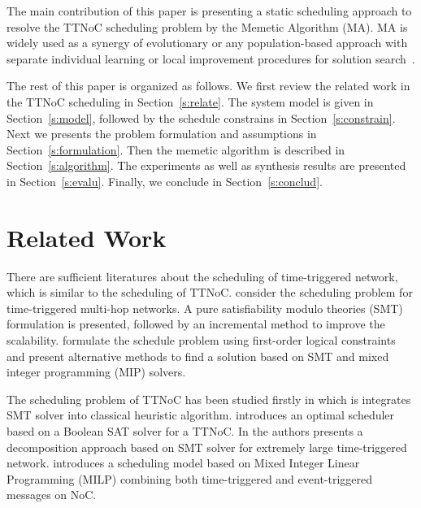 \documentclass[jornal]{IEEEtran}
\begin{document}
The main contribution of this paper is presenting a static scheduling approach to resolve the TTNoC scheduling problem by the Memetic Algorithm (MA). MA is widely used as a synergy of evolutionary or any population-based approach with separate individual learning or local improvement procedures for solution search~\cite{DBLP:journals/tec/ChenOLT11}. 

The rest of this paper is organized as follows. We first review the related work in the TTNoC scheduling in Section~\ref{s:relate}. 
The system model is given in Section~\ref{s:model}, followed by the schedule constrains in Section~\ref{s:constrain}.
Next we presents the problem formulation and assumptions in Section~\ref{s:formulation}.
Then the memetic algorithm is described in Section~\ref{s:algorithm}.
The experiments as well as synthesis results are presented in Section~\ref{s:evalu}.
Finally, we conclude in Section~\ref{s:conclud}.

\section{Related Work	\label{s:relate}}
There are sufficient literatures about the scheduling of time-triggered network, which is similar to the scheduling of TTNoC. 
\cite{DBLP:conf/rtss/Steiner10} consider the scheduling problem for time-triggered multi-hop networks. 
A pure satisfiability modulo theories (SMT) formulation is presented, followed by an incremental method to improve the scalability.
\cite{DBLP:journals/rts/CraciunasO16,DBLP:conf/rtns/CraciunasO14} formulate the schedule problem using first-order logical constraints and present alternative methods to find a solution based on SMT and mixed integer programming (MIP) solvers.

 
The scheduling problem of TTNoC has been
studied firstly in \cite{DBLP:conf/date/HuangBRBK12} which is integrates SMT solver into classical heuristic algorithm. 
\cite{DBLP:conf/sies/ScholerKMO15} introduces an optimal scheduler based on a Boolean SAT solver for a TTNoC.
In \cite{DBLP:conf/etfa/PozoSRH15} the authors presents a decomposition approach based on SMT solver for extremely large time-triggered network.
\cite{DBLP:conf/indin/MurshedOAK15} introduces a scheduling model based on Mixed Integer Linear Programming (MILP) combining both time-triggered and event-triggered messages on NoC.
\end{document}
